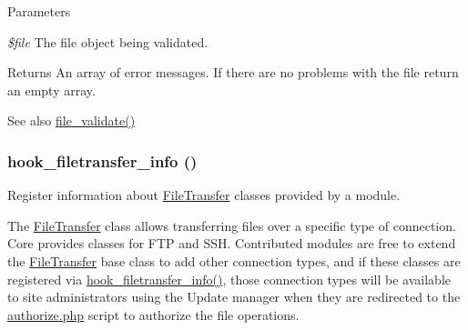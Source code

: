 \begin{DoxyParams}{Parameters}
\item[{\em \$file}]The file object being validated. \end{DoxyParams}
\begin{DoxyReturn}{Returns}
An array of error messages. If there are no problems with the file return an empty array.
\end{DoxyReturn}
\begin{DoxySeeAlso}{See also}
\hyperlink{group__file_ga9edf58fdc552d61247bbf8322c434abf}{file\_\-validate()} 
\end{DoxySeeAlso}
\hypertarget{group__hooks_gacecdedb61704444382417e6ec8da240d}{
\subsubsection[{hook\_\-filetransfer\_\-info}]{\setlength{\rightskip}{0pt plus 5cm}hook\_\-filetransfer\_\-info ()}}
\label{group__hooks_gacecdedb61704444382417e6ec8da240d}
Register information about \hyperlink{classFileTransfer}{FileTransfer} classes provided by a module.

The \hyperlink{classFileTransfer}{FileTransfer} class allows transferring files over a specific type of connection. Core provides classes for FTP and SSH. Contributed modules are free to extend the \hyperlink{classFileTransfer}{FileTransfer} base class to add other connection types, and if these classes are registered via \hyperlink{group__hooks_gacecdedb61704444382417e6ec8da240d}{hook\_\-filetransfer\_\-info()}, those connection types will be available to site administrators using the Update manager when they are redirected to the \hyperlink{authorize_8php}{authorize.php} script to authorize the file operations.

